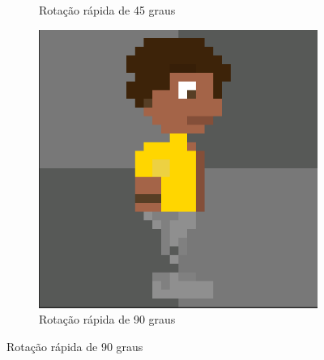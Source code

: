 \begin{figure}[htbp]
\begin{subfigure}{0.32\linewidth}
        \caption{\small Rotação rápida de 45 graus}
        \label{fig:pixelLabRot5b}
    \end{subfigure}
    \begin{subfigure}{0.32\linewidth}
        \includegraphics[width=1\linewidth]{figs/pixelLab/dia2/rotacao 90 graus quick rotate.PNG}
        \caption{\small Rotação rápida de 90 graus}
        \label{fig:pixelLabRot5c}
    \end{subfigure}
\end{figure}

